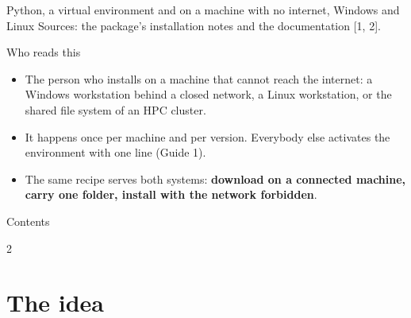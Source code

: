 \documentclass[aspectratio=169,11pt]{beamer}
\begin{document}
  {Python, a virtual environment and \pkgname{} on a machine with no internet, Windows and Linux}
  {Sources: the package's installation notes and the  documentation [1, 2].}

\begin{frame}{Who reads this}
\begin{itemize}
  \item The person who installs \pkgname{} on a machine that cannot reach the
        internet: a Windows workstation behind a closed network, a Linux
        workstation, or the shared file system of an HPC cluster.
  \item It happens once per machine and per version. Everybody else activates
        the environment with one line (Guide 1).
  \item The same recipe serves both systems: \textbf{download on a connected
        machine, carry one folder, install with the network forbidden}.
\end{itemize}
\end{frame}

\begin{frame}{Contents}
\small
\begin{multicols}{2}
\tableofcontents
\end{multicols}
\end{frame}

\section{The idea}
\end{document}
